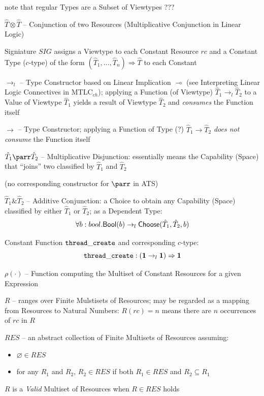 note that regular Types are a Subset of Viewtypes ??? %

$\hat{T} \otimes \hat{T}$ -- Conjunction of two Resources
(Multiplicative Conjunction in Linear Logic)

Signiature $SIG$ assigns a Viewtype to each Constant Resource $rc$ and
a Constant Type ($c$-type) of the form $(\hat{T}_1, \ldots, \hat{T}_n)
\Rightarrow \hat{T}$ to each Constant

$\rightarrow_l$ -- Type Constructor based on Linear Implication
$\multimap$ (see Interpreting Linear Logic Connectives in
MTLC$_{ch}$); applying a Function (of Viewtype) $\hat{T}_1
\rightarrow_l \hat{T}_2$ to a Value of Viewtype $\hat{T}_1$ yields a
result of Viewtype $\hat{T}_2$ and \emph{consumes} the Function itself

$\rightarrow$ -- Type Constructor; applying a Function of Type (?)
$\hat{T}_1 \rightarrow \hat{T}_2$ \emph{does not consume} the Function
itself

$\hat{T}_1 \parr \hat{T}_2$ -- Multiplicative Disjunction: essentially
means the Capability (Space) that ``joins'' two classified by
$\hat{T}_1$ and $\hat{T}_2$

(no corresponding constructor for $\parr$ in ATS)

$\hat{T}_1 \& \hat{T}_2$ -- Additive Conjunction: a Choice to obtain
any Capability (Space) classified by either $\hat{T}_1$ or
$\hat{T}_2$; as a Dependent Type:
\[
  \forall b : bool. \mathsf{Bool}(b)
    \rightarrow_l \mathsf{Choose}(\hat{T}_1, \hat{T}_2, b)
\]

Constant Function $\mathtt{thread\_create}$ and corresponding $c$-type:
\[
  \mathtt{thread\_create} : (\mathbf{1} \rightarrow_l \mathbf{1}) \Rightarrow \mathbf{1}
\]

$\rho(\cdot)$ -- Function computing the Multiset of Constant Resources
for a given Expression %

$R$ -- ranges over Finite Mulstisets of Resources; may be regarded as
a mapping from Resources to Natural Numbers: $R(rc) = n$ means there
are $n$ occurrences of $rc$ in $R$

$RES$ -- an abstract collection of Finite Multisets of Resources
assuming:
\begin{itemize}
  \item $\varnothing \in RES$
  \item for any $R_1$ and $R_2$, $R_2 \in RES$ if both $R_1 \in RES$
    and $R_2 \subseteq R_1$
\end{itemize}
$R$ is a \emph{Valid} Multiset of Resources when $R \in RES$ holds

